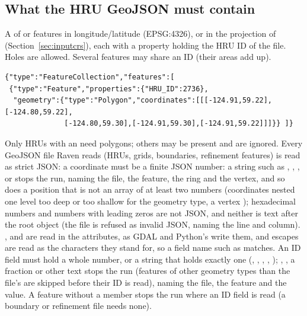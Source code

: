 \subsection{What the HRU GeoJSON must contain}
A  of  or  features in longitude/latitude (EPSG:4326), or in the
projection of  (Section~\ref{sec:inputcrs}), each with a property holding the HRU ID of the  file. Holes are allowed. Several features may share an ID (their areas add up).
\par\noindent\begin{minipage}{\linewidth}
\begin{lstlisting}
{"type":"FeatureCollection","features":[
 {"type":"Feature","properties":{"HRU_ID":2736},
  "geometry":{"type":"Polygon","coordinates":[[[-124.91,59.22],[-124.80,59.22],
              [-124.80,59.30],[-124.91,59.30],[-124.91,59.22]]]}} ]}
\end{lstlisting}
\end{minipage}\par\smallskip
Only HRUs with an  need polygons; others may be present and are ignored.
Every GeoJSON file Raven reads (HRUs, grids, boundaries, refinement features) is read as strict JSON: a coordinate must be a
finite JSON number: a string such as , , ,  or  stops the run,
naming the file, the feature, the ring and the vertex, and so does a position that is not an array of at least two
numbers (coordinates nested one level too deep or too shallow for the geometry type, a vertex \cmd{[1]}); hexadecimal
numbers and numbers with leading zeros are not JSON, and neither is text after the root object (the file is refused as
invalid JSON, naming the line and column). ,  and  are read in the attributes, as
GDAL and Python's  write them, and  escapes are read as the characters they stand for,
so a field name such as  matches. An ID field must hold a whole number, or a string that holds exactly
one (, , , , ); , , a fraction or other text stops the run
(features of other geometry types than the file's are skipped before their ID is read), naming the file, the
feature and the value. A feature without a  member stops the run where an ID field is read (a boundary
or refinement file needs none).
